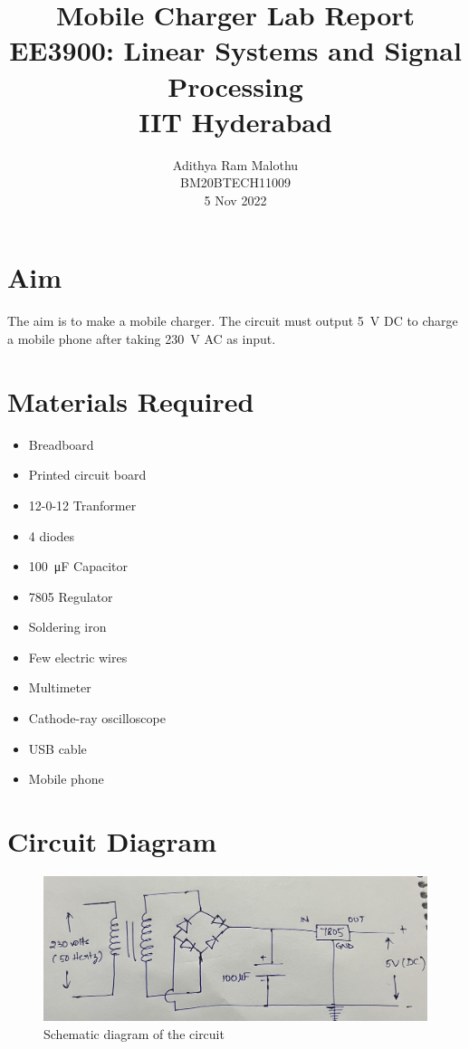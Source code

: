 \documentclass[journal,12pt,twocolumn]{IEEEtran}
\title{Mobile Charger Lab Report \\ \Large EE3900: Linear Systems and Signal Processing \\ \large IIT Hyderabad}
\author{Adithya Ram Malothu \\ \normalsize BM20BTECH11009 \\ \vspace*{20pt} \normalsize 5 Nov 2022}
\numberwithin{equation}{section}
\numberwithin{figure}{section}
\begin{document}
	\maketitle

	\section{Aim}
	The aim is to make a mobile charger. The circuit must output \SI{5}{\volt} DC to charge a mobile phone after taking \SI{230}{\volt} AC as input.
	
	\section{Materials Required}
	\begin{itemize}
	\item Breadboard
	\item Printed circuit board
	\item 12-0-12 Tranformer
	\item 4 diodes
	\item \SI{100}{\micro\farad} Capacitor
	\item 7805 Regulator
	\item Soldering iron
	\item Few electric wires
	\item Multimeter
	\item Cathode-ray oscilloscope
	\item USB cable
	\item Mobile phone
	\end{itemize}

	\section{Circuit Diagram}
	\begin{figure}[!ht]
		\centering
		\includegraphics[width=\columnwidth]{./FIGURES/circuit.png}
		\caption{Schematic diagram of the circuit}
		\label{fig-ckt}	
	\end{figure}
	
\end{document}
